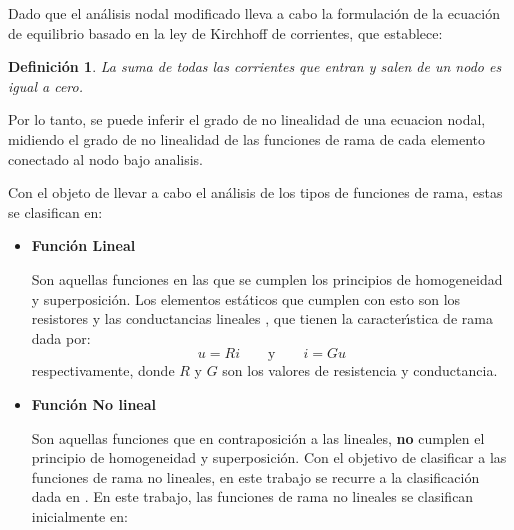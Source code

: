 \documentclass[conference,letterpaper,onecolumn]{IEEEtran}
\newtheorem{Theod}{{\bf Definici\'on}}
\begin{document}
Dado que el an\'alisis nodal modificado lleva a cabo la formulaci\'on
de la ecuaci\'on de equilibrio basado en la ley de Kirchhoff de
corrientes, que establece:
\begin{Theod}
La suma de todas las corrientes que entran y salen de un nodo es igual a cero.
\end{Theod}

Por lo tanto, se puede inferir el grado de no linealidad de una ecuacion nodal, midiendo
el grado de no linealidad de las funciones de rama de cada elemento conectado al nodo bajo analisis.

Con el objeto de llevar a cabo el an\'alisis de los tipos de funciones
de rama, estas se clasifican en:

\begin{itemize}
\item {\bf Funci\'on Lineal}\hfill \par
Son aquellas funciones en las que se cumplen los principios de homogeneidad y
superposici\'on. Los elementos est\'aticos que cumplen con esto son
los resistores y las conductancias lineales \cite{Vlach_book}, que
tienen la caracter\'{\i}stica de rama dada por:
\begin{displaymath}
u= R i \qquad \mbox{y} \qquad i=G u
\end{displaymath}
respectivamente, donde $R$ y $G$ son los valores de resistencia y conductancia.


\item {\bf Funci\'on No lineal}\hfill \par
Son aquellas funciones que en contraposici\'on a las lineales, {\bf no} cumplen
el princi\-pio de homogeneidad y superposici\'on.
Con el objetivo de clasificar a las funciones de rama no lineales,
en este trabajo se recurre a la clasificaci\'on dada en \cite{cont_leu11}.
En este trabajo, las funciones de rama no lineales se clasifican
inicialmente en:
\end{itemize}
\end{document}
